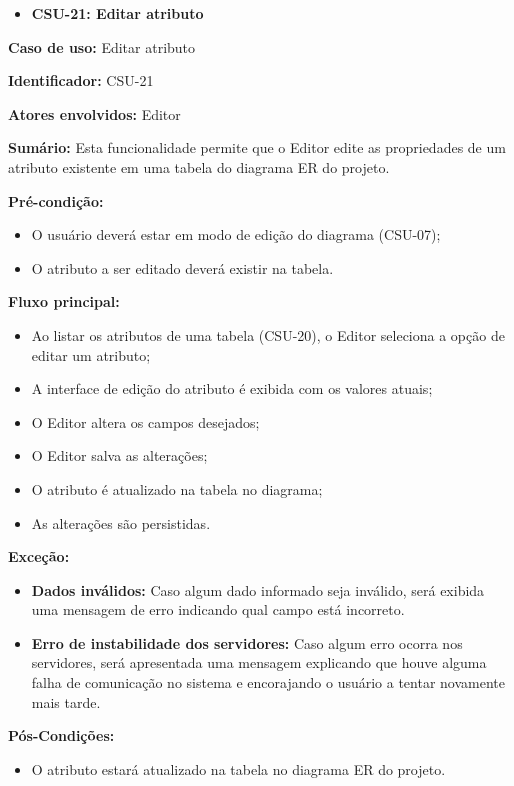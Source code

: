 \begin{itemize}
    \item \textbf{CSU-21: Editar atributo}
\end{itemize}

\textbf{Caso de uso:} Editar atributo

\textbf{Identificador:} CSU-21

\textbf{Atores envolvidos:} Editor

\textbf{Sumário:} Esta funcionalidade permite que o Editor edite as propriedades de um atributo existente em uma tabela do diagrama ER do projeto.

\textbf{Pré-condição:}
\begin{itemize}
    \item O usuário deverá estar em modo de edição do diagrama (CSU-07);
    \item O atributo a ser editado deverá existir na tabela.
\end{itemize}

\textbf{Fluxo principal:}
\begin{itemize}
    \item Ao listar os atributos de uma tabela (CSU-20), o Editor seleciona a opção de editar um atributo;
    \item A interface de edição do atributo é exibida com os valores atuais;
    \item O Editor altera os campos desejados;
    \item O Editor salva as alterações;
    \item O atributo é atualizado na tabela no diagrama;
    \item As alterações são persistidas.
\end{itemize}

\textbf{Exceção:}
\begin{itemize}
    \item \textbf{Dados inválidos:} Caso algum dado informado seja inválido, será exibida uma mensagem de erro indicando qual campo está incorreto.
    \item \textbf{Erro de instabilidade dos servidores:} Caso algum erro ocorra nos servidores, será apresentada uma mensagem explicando que houve alguma falha de comunicação no sistema e encorajando o usuário a tentar novamente mais tarde.
\end{itemize}

\textbf{Pós-Condições:}
\begin{itemize}
    \item O atributo estará atualizado na tabela no diagrama ER do projeto.
\end{itemize}

